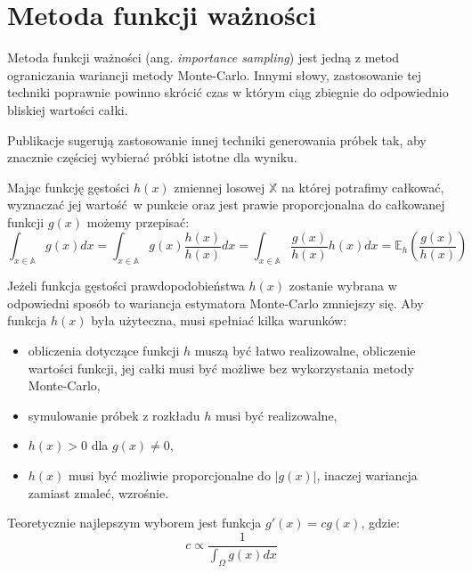 \documentclass[../main.tex]{subfiles}
\begin{document}
\section{Metoda funkcji ważności}

Metoda funkcji ważności (ang. \textit{importance sampling}) jest jedną z metod ograniczania wariancji metody Monte-Carlo. Innymi słowy, zastosowanie tej techniki poprawnie powinno skrócić czas w którym ciąg zbiegnie do odpowiednio bliskiej wartości całki.

Publikacje \cite{Veach,MonteCarloAnderson} sugerują zastosowanie innej techniki generowania próbek tak, aby znacznie częściej wybierać próbki istotne dla wyniku.

Mając funkcję gęstości $h(x)$ zmiennej losowej $\mathbb{X}$ na której potrafimy całkować, wyznaczać jej wartość w punkcie oraz jest prawie proporcjonalna do całkowanej funkcji $g(x)$ możemy przepisać:
\begin{equation}
  \int_{x \in \mathbb{A}} { g(x) dx } =
  \int_{x \in \mathbb{A}} { g(x) \frac{h(x)}{h(x)} dx } =
  \int_{x \in \mathbb{A}} { \frac{g(x)}{h(x)} h(x) dx } =
  \mathbb{E}_{h}\left({ \frac{g(x)}{h(x)} }\right)
\end{equation}

Jeżeli funkcja gęstości prawdopodobieństwa $h(x)$ zostanie wybrana w odpowiedni sposób to wariancja estymatora Monte-Carlo zmniejszy się. Aby funkcja $h(x)$ była użyteczna, musi spełniać kilka warunków:

\begin{itemize}

  \item obliczenia dotyczące funkcji $h$ muszą być łatwo realizowalne, obliczenie wartości funkcji, jej całki musi być możliwe bez wykorzystania metody Monte-Carlo,

  \item symulowanie próbek z rozkładu $h$ musi być realizowalne,

  \item $h(x) > 0$ dla $g(x) \neq 0$,

  \item $h(x)$ musi być możliwie proporcjonalne do $|g(x)|$, inaczej wariancja zamiast zmaleć, wzrośnie.

\end{itemize}

Teoretycznie najlepszym wyborem jest funkcja $g'(x) = cg(x)$, gdzie:
\begin{equation}
    c \propto \frac{1}{\int_{\Omega}{g(x)dx}}
    \label{eq:mc_importance_best_function}
\end{equation}
\end{document}
